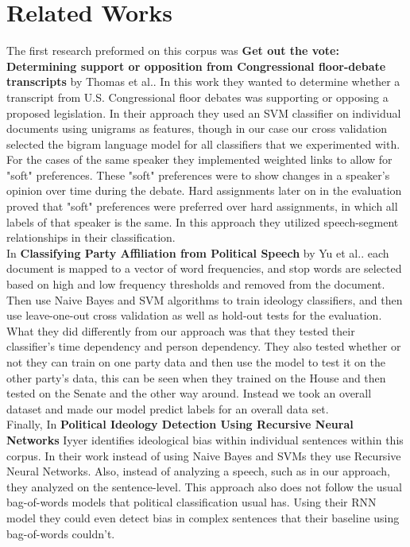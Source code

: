 \documentclass[a4paper, 12pt]{article}
\begin{document}
\section{Related Works}
\label{gen_inst}
The first research preformed on this corpus was \cite{thomas2006get} \textbf{Get out the vote: Determining support or opposition from Congressional floor-debate transcripts} by Thomas et al.. In this work they wanted to determine whether a transcript from U.S. Congressional floor debates was supporting or opposing a proposed legislation. In their approach they used an SVM classifier on individual documents using unigrams as features, though in our case our cross validation selected the bigram language model for all classifiers that we experimented with. For the cases of the same speaker they implemented weighted links to allow for "soft" preferences. These "soft" preferences were to show changes in a speaker's opinion over time during the debate. Hard assignments later on in the evaluation proved that "soft" preferences were preferred over hard assignments, in which all labels of that speaker is the same. In this approach they utilized speech-segment relationships in their classification. \\

\noindent	
In \cite{yu2008classifying} \textbf{Classifying Party Affiliation from Political Speech} by Yu et al.. each document is mapped to a vector of word frequencies, and stop words are selected based on high and low frequency thresholds and removed from the document. Then use Naive Bayes and SVM algorithms to train ideology classifiers, and then use leave-one-out cross validation as well as hold-out tests for the evaluation. What they did differently from our approach was that they tested their classifier's time dependency and person dependency. They also tested whether or not they can train on one party data and then use the model to test it on the other party's data, this can be seen when they trained on the House and then tested on the Senate and the other way around. Instead we took an overall dataset and made our model predict labels for an overall data set.\\

\noindent
Finally, In  \cite{iyyer2014political} \textbf{Political Ideology Detection Using Recursive Neural Networks} Iyyer identifies ideological bias within individual sentences within this corpus. In their work instead of using Naive Bayes and SVMs they use Recursive Neural Networks. Also, instead of analyzing a speech, such as in our approach, they analyzed on the sentence-level. This approach also does not follow the usual bag-of-words models that political classification usual has. Using their RNN model they could even detect bias in complex sentences that their baseline using bag-of-words couldn't. 
	
\end{document}

